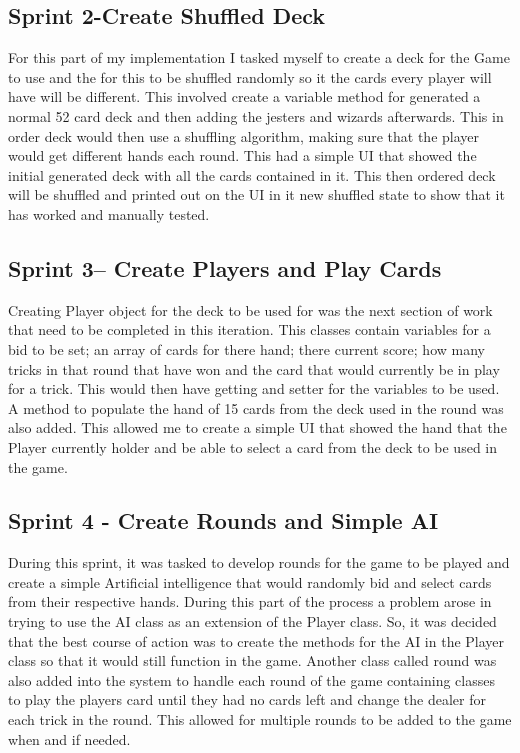 \subsection{Sprint 2-Create Shuffled Deck}
For this part of my implementation I tasked myself to create a deck for the Game to use and the for this to be shuffled randomly so it the cards every player will have will be different. This involved create a variable method for generated a normal 52 card deck and then adding the jesters and wizards afterwards. This in order deck would then use a shuffling algorithm\cite{shuffle}, making sure that the player would get different hands each round. This had a simple UI that showed the initial generated deck with all the cards contained in it. This then ordered deck will be shuffled and printed out on the UI in it new shuffled state to show that it has worked and manually tested.
\subsection{Sprint 3-- Create Players and Play Cards}
Creating Player object for the deck to be used for was the next section of work that need to be completed in this iteration. This classes contain variables for a bid to be set; an array of cards for there hand; there current score; how many tricks in that round that have won and the card that would currently be in play for a trick. This would then have getting and setter for the variables to be used. A method to populate the hand of 15 cards from the deck used in the round was also added. This allowed me to create a simple UI that showed the hand that the Player currently holder and be able to select a card from the deck to be used in the game. 
\subsection{Sprint 4 - Create Rounds and Simple AI}
During this sprint, it was tasked to develop rounds for the game to be played and create a simple Artificial intelligence that would randomly bid and select cards from their respective hands. During this part of the process a problem arose in trying to use the AI class as an extension of the Player class. So, it was decided that the best course of action was to create the methods for the AI in the Player class so that it would still function in the game. Another class called round was also added into the system to handle each round of the game containing classes to play the players card until they had no cards left and change the dealer for each trick in the round. This allowed for multiple rounds to be added to the game when and if needed. 
